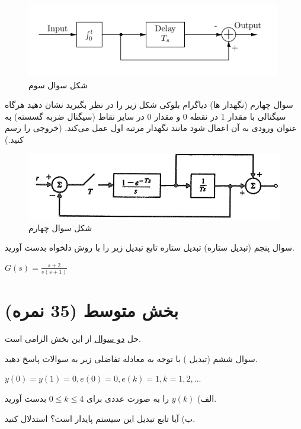 \documentclass{article}
\begin{document}
    \begin{figure}[htbp]
    	\centering
    	\includegraphics{Second Series/4.png}
    	\caption{شکل سوال سوم}
    \end{figure}
    
    
    \begin{problem}{سوال چهارم}
    	(نگهدار ها) دیاگرام بلوکی شکل زیر را در نظر بگیرید نشان دهید هرگاه سیگنالی با مقدار 1 در نقطه 0 و مقدار 0 در سایر نقاط (سیگنال ضربه گسسته) به عنوان ورودی به آن اعمال شود مانند نگهدار مرتبه اول عمل می‌کند. (خروجی را رسم کنید.)
    \end{problem}
    \begin{figure}[htbp]
    	\includegraphics[width=\linewidth]{Second Series/5.png}
    	\caption{شکل سوال چهارم}
    \end{figure}
    
    \begin{problem}{سوال پنجم}
    	(تبدیل ستاره) تبدیل ستاره تابع تبدیل زیر را با روش دلخواه بدست آورید.
    	
    	\centering
    	$G(s) = \frac{s+2}{s(s+1)}$
    	
    	\raggedright
    \end{problem}
\raggedleft    
\section{بخش متوسط (35 نمره)}
\centering
حل \underline{دو سوال} از این بخش الزامی است.
\begin{problem}{سوال ششم}
	(تبدیل ) با توجه به معادله تفاضلی زیر به سوالات پاسخ دهید.

\centering
$y(0) = y(1) = 0 , e(0) = 0 , e(k) = 1 , k = 1,2,...$



\raggedright

الف) $y(k)$ را به صورت عددی برای
$0 \leq k \leq 4$
 بدست آورید.
  
  ب) آیا تابع تبدیل این سیستم پایدار است؟ استدلال کنید.

\end{problem}
	
\end{document}
